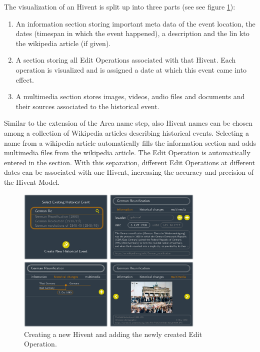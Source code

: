 The visualization of an Hivent is split up into three parts (see see figure \ref{fig:uncertainty_new_hivent_box}):

\begin{enumerate}
  \item An information section storing important meta data of the event location, the dates (timespan in which the event happened), a description and the lin kto the wikipedia article (if given).
  \item A section storing all Edit Operations associated with that Hivent. Each operation is visualized and is assigned a date at which this event came into effect.
  \item A multimedia section stores images, videos, audio files and documents and their sources associated to the historical event.
\end{enumerate}

Similar to the extension of the Area name step, also Hivent names can be chosen among a collection of Wikipedia articles describing historical events. Selecting a name from a wikipedia article automatically fills the information section and adds multimedia files from the wikipedia article. The Edit Operation is automatically entered in the section. With this separation, different Edit Operations at different dates can be associated with one Hivent, increasing the accuracy and precision of the Hivent Model.

\begin{figure}[ht]
  \centering
  \includegraphics[width = 0.8\textwidth]{graphics/extensions/new_hivent_box}
  \caption{Creating a new Hivent and adding the newly created Edit Operation.}
  \label{fig:uncertainty_new_hivent_box}
\end{figure}

